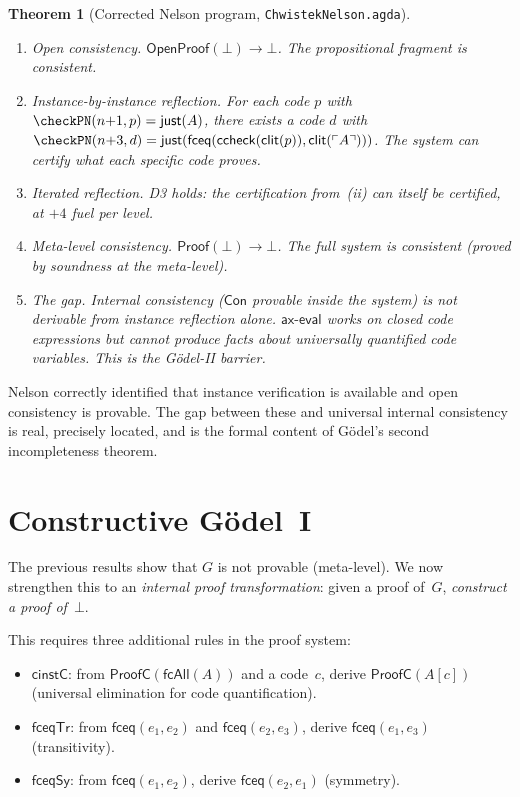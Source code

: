 \documentclass[11pt]{article}
\newtheorem{theorem}{Theorem}[section]
\newcommand{\Proof}{\mathsf{Proof}}
\newcommand{\enc}[1]{\ulcorner #1 \urcorner}
\newcommand{\clit}{\mathsf{clit}}
\newcommand{\ccheck}{\mathsf{ccheck}}
\newcommand{\fbot}{\bot}
\newcommand{\fceq}{\mathsf{fceq}}
\newcommand{\fcAll}{\mathsf{fcAll}}
\begin{document}
\begin{theorem}[Corrected Nelson program, \texttt{ChwistekNelson.agda}]
\leavevmode
\begin{enumerate}[label=(\roman*)]
\item \emph{Open consistency.}
  $\mathsf{OpenProof}(\fbot) \to \bot$.
  The propositional fragment is consistent.

\item \emph{Instance-by-instance reflection.}
  For each code $p$ with $\checkPN(n{+}1, p) = \mathsf{just}(A)$,
  there exists a code $d$ with
  $\checkPN(n{+}3, d) = \mathsf{just}(\fceq(\ccheck(\clit(p)),
  \clit(\enc{A})))$.
  The system can certify what each specific code proves.

\item \emph{Iterated reflection.}
  D3 holds: the certification from~(ii) can itself be
  certified, at $+4$ fuel per level.

\item \emph{Meta-level consistency.}
  $\Proof(\fbot) \to \bot$.
  The full system is consistent (proved by soundness at the meta-level).

\item \emph{The gap.}
  Internal consistency ($\mathsf{Con}$ provable inside the system)
  is not derivable from instance reflection alone.
  $\mathsf{ax\text{-}eval}$ works on closed code expressions but cannot
  produce facts about universally quantified code variables.
  This is the G\"odel-II barrier.
\end{enumerate}
\end{theorem}

Nelson correctly identified that instance verification is available
and open consistency is provable. The gap between these and universal
internal consistency is real, precisely located, and is the formal
content of G\"odel's second incompleteness theorem.

\section{Constructive G\"odel~I}
\label{sec:constructive}

The previous results show that $G$ is not provable (meta-level).
We now strengthen this to an \emph{internal proof transformation}:
given a proof of~$G$, \emph{construct a proof of}~$\fbot$.

This requires three additional rules in the proof system:
\begin{itemize}
\item $\mathsf{cinstC}$: from $\mathsf{ProofC}(\fcAll(A))$ and a code~$c$,
  derive $\mathsf{ProofC}(A[c])$ (universal elimination for code quantification).
\item $\mathsf{fceqTr}$: from $\fceq(e_1,e_2)$ and $\fceq(e_2,e_3)$,
  derive $\fceq(e_1,e_3)$ (transitivity).
\item $\mathsf{fceqSy}$: from $\fceq(e_1,e_2)$, derive $\fceq(e_2,e_1)$
  (symmetry).
\end{itemize}
\end{document}

